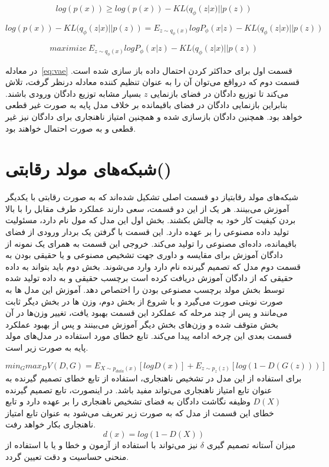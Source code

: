 \documentclass[12pt,a4paper]{report}
\theoremstyle{definition}
\theoremstyle{definition}
\begin{document}
\begin{equation}
log(p(x)) \ge log(p(x)) - KL(q_\phi(z|x) || p(z))
\end{equation}

\begin{equation}
log(p(x)) - KL(q_\phi(z|x) || p(z)) = E_{z \sim q_\phi(x)}logP_\phi(x|z)  -  KL(q_\phi(z|x) || p(z))
\end{equation}


\begin{equation}
maximize\  E_{z \sim q_\phi(x)}logP_\phi(x|z)  -  KL(q_\phi(z|x) || p(z))
\label{eq:vae}
\end{equation}

در معادله~\eqref{eq:vae} قسمت اول برای حداکثر کردن احتمال داده باز سازی شده است. قسمت دوم که درواقع می‌توان آن را به عنوان تنظیم کننده معادله درنظر گرفت، تلاش می‌کند تا توزیع دادگان در فضای بازنمایی $z$ بسیار مشابه توزیع دادگان ورودی باشند. بنابراین بازنمایی دادگان در فضای باقیمانده بر خلاف مدل پایه به صورت غیر قطعی خواهد بود. همچنین دادگان بازسازی شده و همچنین امتیاز ناهنجاری برای دادگان نیز غیر قطعی و به صورت احتمال خواهند بود. 


\section{شبکه‌های مولد رقابتی()}
شبکه‌های مولد رقابتیاز دو قسمت اصلی تشکیل شده‌اند که به صورت رقابتی با یکدیگر آموزش می‌بینند. هر یک از این دو قسمت، سعی دارند عملکرد طرف مقابل را با بالا بردن کیفیت کار خود به چالش بکشند. بخش اول این مدل که مول نام دارد، مسئولیت تولید داده مصنوعی را بر عهده دارد. این قسمت با گرفتن یک بردار ورودی از فضای باقیمانده، داده‌ای مصنوعی را تولید می‌کند. خروجی این قسمت به همرای یک نمونه از دادگان آموزش برای مقایسه و داوری جهت تشخیص مصنوعی و یا حقیقی بودن به قسمت دوم مدل که تصمیم گیرنده نام دارد وارد می‌شوند. بخش دوم باید بتواند به داده حقیقی که از دادگان آموزش دریافت کرده است برچسب حقیقی و به داده تولید شده توسط بخش مولد برچسب مصنوعی بودن را اختصاص دهد. آموزش این مدل ها به صورت نوبتی صورت می‌گیرد و با شروع از بخش دوم، وزن ها در بخش دیگر ثابت می‌مانند و پس از چند مرحله که عملکرد این قسمت بهبود یافت، تغییر وزن‌ها در آن بخش متوقف شده و وزن‌های بخش دیگر آموزش می‌بینند و پس از بهبود عملکرد قسمت بعدی این چرخه ادامه پیدا می‌کند. تابع خطای مورد استفاده در مدل‌های مولد پایه به صورت زیر است.

\begin{equation}
	min_G max_D V(D, G) = E_{X \sim p_{data}(x)}[logD(x)] + E_{z \sim p_z(z)}[log(1-D(G(z)))]
\end{equation}
برای استفاده از این مدل در تشخیص ناهنجاری‌، استفاده از تابع خطای تصمیم گیرنده به عنوان تابع امتیاز ناهنجاری می‌تواند مفید باشد. در اینصورت، تابع تصمیم گیرنده $D(X)$ وظیفه نگاشت دادگان به فضای تشخیص ناهنجاری را بر عهده دارد و تابع خطای این قسمت از مدل که به صورت زیر تعریف می‌شود به عنوان تابع امتیاز ناهنجاری بکار خواهد رفت.
\begin{equation}
d(x) = log(1- D(X))
\end{equation}
 میزان آستانه تصمیم گیری $\delta$ نیز می‌تواند با استفاده از آزمون و خطا و یا با استفاده از منحنی حساسیت و دقت تعیین گردد.\\
\end{document}
